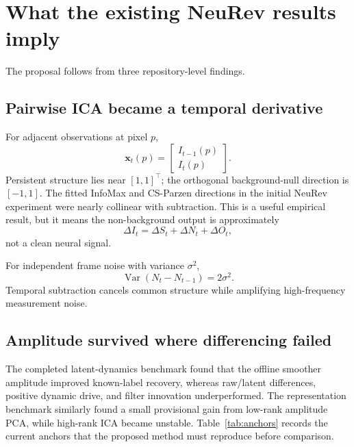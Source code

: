 \documentclass[11pt]{article}
\newcommand{\Var}{\operatorname{Var}}
\begin{document}
\section{What the existing NeuRev results imply}

The proposal follows from three repository-level findings.

\subsection{Pairwise ICA became a temporal derivative}

For adjacent observations at pixel \(p\),
\begin{equation}
\bm x_t(p)=
\begin{bmatrix}
I_{t-1}(p)\\ I_t(p)
\end{bmatrix}.
\end{equation}
Persistent structure lies near \([1,1]^\top\); the orthogonal background-null
direction is \([-1,1]\). The fitted InfoMax and CS-Parzen directions in the
initial NeuRev experiment were nearly collinear with subtraction. This is a
useful empirical result, but it means the non-background output is approximately
\begin{equation}
\Delta I_t = \Delta S_t + \Delta N_t + \Delta O_t,
\end{equation}
not a clean neural signal.

For independent frame noise with variance \(\sigma^2\),
\begin{equation}
\Var(N_t-N_{t-1})=2\sigma^2.
\label{eq:diff-noise}
\end{equation}
Temporal subtraction cancels common structure while amplifying high-frequency
measurement noise.

\subsection{Amplitude survived where differencing failed}

The completed latent-dynamics benchmark found that the offline smoother
amplitude improved known-label recovery, whereas raw/latent differences,
positive dynamic drive, and filter innovation underperformed. The representation
benchmark similarly found a small provisional gain from low-rank amplitude PCA,
while high-rank ICA became unstable. Table~\ref{tab:anchors} records the current
anchors that the proposed method must reproduce before comparison.
\end{document}
